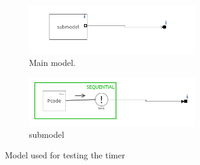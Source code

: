 \documentclass[a4paper,twoside,11pt]{article}
\begin{document}
\begin{figure}
 \centering
 \begin{subfigure}{\textwidth}
  \centering
  \includegraphics[width=0.8\textwidth]{./img/timer-mainmodel.png}
  \caption{Main model.}
 \end{subfigure}
 \begin{subfigure}{\textwidth}
  \centering
  \includegraphics[width=0.8\textwidth]{./img/timer-submodel.png}
  \caption{submodel}
 \end{subfigure}
 \caption{Model used for testing the timer}
 \label{fig:timermodel}
\end{figure}

\FloatBarrier
\end{document}
